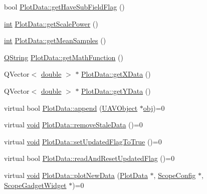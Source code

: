 \begin{DoxyCompactItemize}
\item 
bool \hyperlink{group___scope_plugin_gaac624ceed7580c679cbbb43c46881718}{Plot\-Data\-::get\-Have\-Sub\-Field\-Flag} ()
\item 
\hyperlink{ioapi_8h_a787fa3cf048117ba7123753c1e74fcd6}{int} \hyperlink{group___scope_plugin_ga598d81218b7c2912d88b61e5b1e9d342}{Plot\-Data\-::get\-Scale\-Power} ()
\item 
\hyperlink{ioapi_8h_a787fa3cf048117ba7123753c1e74fcd6}{int} \hyperlink{group___scope_plugin_ga21623188dbae082bf46f247209363664}{Plot\-Data\-::get\-Mean\-Samples} ()
\item 
\hyperlink{group___u_a_v_objects_plugin_gab9d252f49c333c94a72f97ce3105a32d}{Q\-String} \hyperlink{group___scope_plugin_ga22e23fa455628102d53af51bb4ff4a62}{Plot\-Data\-::get\-Math\-Function} ()
\item 
Q\-Vector$<$ \hyperlink{_super_l_u_support_8h_a8956b2b9f49bf918deed98379d159ca7}{double} $>$ $\ast$ \hyperlink{group___scope_plugin_gaadbf87fb25ba73a5079d44e88f357cd9}{Plot\-Data\-::get\-X\-Data} ()
\item 
Q\-Vector$<$ \hyperlink{_super_l_u_support_8h_a8956b2b9f49bf918deed98379d159ca7}{double} $>$ $\ast$ \hyperlink{group___scope_plugin_gac891ccbeaba7cca3cc03233f4ecd0cda}{Plot\-Data\-::get\-Y\-Data} ()
\item 
virtual bool \hyperlink{group___scope_plugin_ga5b3222f1966c12cc3dbbfe79f80f49e8}{Plot\-Data\-::append} (\hyperlink{class_u_a_v_object}{U\-A\-V\-Object} $\ast$\hyperlink{glext_8h_a0c0d4701a6c89f4f7f0640715d27ab26}{obj})=0
\item 
virtual \hyperlink{group___u_a_v_objects_plugin_ga444cf2ff3f0ecbe028adce838d373f5c}{void} \hyperlink{group___scope_plugin_gaa72c7c3b2933a5f313be52020c003990}{Plot\-Data\-::remove\-Stale\-Data} ()=0
\item 
virtual \hyperlink{group___u_a_v_objects_plugin_ga444cf2ff3f0ecbe028adce838d373f5c}{void} \hyperlink{group___scope_plugin_ga9c8859638969e941f2e71d57b9454c37}{Plot\-Data\-::set\-Updated\-Flag\-To\-True} ()=0
\item 
virtual bool \hyperlink{group___scope_plugin_ga18a9ab6db2aa09b675a0ede1e0bfddc6}{Plot\-Data\-::read\-And\-Reset\-Updated\-Flag} ()=0
\item 
virtual \hyperlink{group___u_a_v_objects_plugin_ga444cf2ff3f0ecbe028adce838d373f5c}{void} \hyperlink{group___scope_plugin_ga804704f7eaf4186938e8d1163a9d410c}{Plot\-Data\-::plot\-New\-Data} (\hyperlink{class_plot_data}{Plot\-Data} $\ast$, \hyperlink{class_scope_config}{Scope\-Config} $\ast$, \hyperlink{class_scope_gadget_widget}{Scope\-Gadget\-Widget} $\ast$)=0

\end{DoxyCompactItemize}
